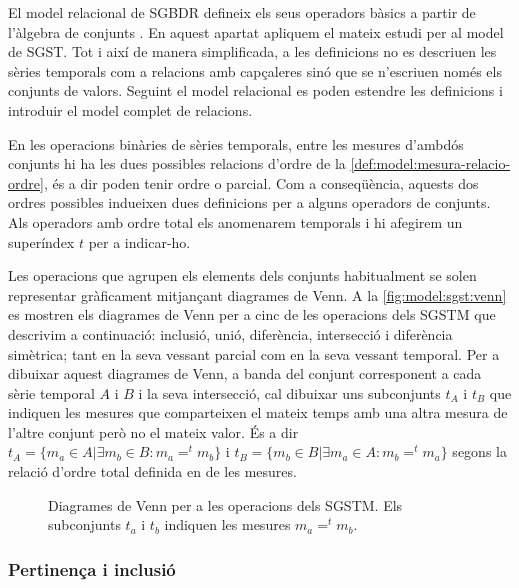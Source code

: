 El model relacional de \gls{SGBDR} defineix els seus operadors bàsics
a partir de l'àlgebra de
conjunts \parencite[cap.~7]{date04:introduction8}. En aquest apartat
apliquem el mateix estudi per al model de \gls{SGST}. Tot i així de
manera simplificada, a les definicions no es descriuen les sèries
temporals com a relacions amb capçaleres sinó que se n'escriuen només
els conjunts de valors. Seguint el model relacional es poden estendre
les definicions i introduir el model complet de relacions.



En les operacions binàries de sèries temporals, entre les mesures
d'ambdós conjunts hi ha les dues possibles relacions d'ordre de la
\autoref{def:model:mesura-relacio-ordre}, és a dir poden tenir ordre o
parcial. Com a conseqüència, aquests dos ordres possibles indueixen
dues definicions per a alguns operadors de conjunts. Als operadors amb
ordre total els anomenarem temporals i hi afegirem un superíndex $t$
per a indicar-ho.


Les operacions que agrupen els elements dels conjunts habitualment se
solen representar gràficament mitjançant diagrames de Venn. A la
\autoref{fig:model:sgst:venn} es mostren els diagrames de Venn per a
cinc de les operacions dels \gls{SGSTM} que descrivim a continuació:
inclusió, unió, diferència, intersecció i diferència simètrica; tant
en la seva vessant parcial com en la seva vessant temporal.  Per a
dibuixar aquest diagrames de Venn, a banda del conjunt corresponent a
cada sèrie temporal $A$ i $B$ i la seva intersecció, cal dibuixar uns
subconjunts $t_A$ i $t_B$ que indiquen les mesures que comparteixen el
mateix temps amb una altra mesura de l'altre conjunt però no el mateix
valor. És a dir $t_A = \{ m_a \in A | \exists m_b \in B: m_a =^t m_b
\}$ i $t_B = \{ m_b \in B | \exists m_a \in A: m_b =^t m_a \}$ segons
la relació d'ordre total definida en de les mesures.


\begin{figure}[tp]
  \centering
  
  \caption{Diagrames de Venn per a les operacions dels \gls{SGSTM}. Els
    subconjunts $t_a$ i $t_b$ indiquen les mesures $m_a =^t m_b$.}
  \label{fig:model:sgst:venn}
\end{figure}


\subsubsection{Pertinença i inclusió}


